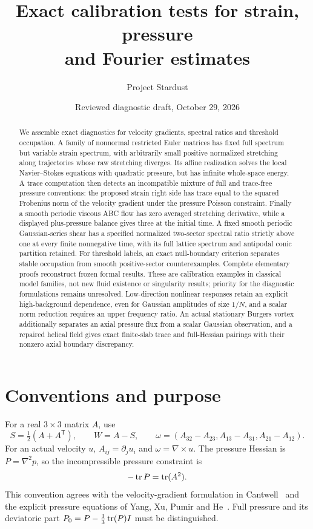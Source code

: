 \documentclass[11pt]{article}
\title{Exact calibration tests for strain, pressure\\and Fourier estimates}
\author{Project Stardust}
\date{Reviewed diagnostic draft, October 29, 2026}
\begin{document}
\maketitle
\begin{abstract}
We assemble exact diagnostics for velocity gradients, spectral ratios
and threshold occupation.
A family of nonnormal restricted Euler matrices has fixed full spectrum but
variable strain spectrum, with arbitrarily small positive normalized
stretching along trajectories whose raw stretching diverges. Its affine
realization solves the local Navier--Stokes equations with quadratic
pressure, but has infinite whole-space energy. A trace computation then
detects an incompatible mixture of full and trace-free pressure
conventions: the proposed strain right side has trace equal to the squared
Frobenius norm of the velocity gradient under the pressure Poisson
constraint. Finally a smooth periodic viscous ABC flow has zero averaged
stretching derivative, while a displayed plus-pressure balance gives
three at the initial time. A fixed smooth periodic Gaussian-series shear
has a specified normalized two-sector spectral ratio strictly above one
at every finite nonnegative time, with its full lattice spectrum and
antipodal conic partition retained. For threshold labels, an exact
null-boundary criterion separates stable occupation from smooth
positive-sector counterexamples. Complete elementary proofs reconstruct frozen
formal results. These are calibration examples in classical model
families, not new fluid existence or singularity results; priority for
the diagnostic formulations remains unresolved.
Low-direction nonlinear responses retain an explicit high-background dependence,
even for Gaussian amplitudes of size $1/N$, and a scalar norm reduction
requires an upper frequency ratio. An actual stationary Burgers vortex additionally separates an axial pressure flux from a scalar Gaussian observation, and a repaired helical field gives exact finite-slab trace and full-Hessian pairings with their nonzero axial boundary discrepancy. \end{abstract}

\section{Conventions and purpose}
For a real $3\times3$ matrix $A$, use
\[
 S=\tfrac12(A+A^{\mathsf T}),\qquad W=A-S,\qquad
 \omega=(A_{32}-A_{23},A_{13}-A_{31},A_{21}-A_{12}).
\]
For an actual velocity $u$, $A_{ij}=\partial_j u_i$ and $\omega=\nabla\times u$.
The pressure Hessian is $P=\nabla^2p$, so the incompressible pressure
constraint is
\begin{equation}\label{eq:poisson}
 -\operatorname{tr} P=\operatorname{tr}(A^2).
\end{equation}
This convention agrees with the velocity-gradient formulation in
Cantwell~\cite{Cantwell} and the explicit pressure equations of
Yang, Xu, Pumir and He~\cite{Yang}. Full pressure and its deviatoric
part $P_0=P-\tfrac13\operatorname{tr}(P)I$ must be distinguished.
\end{document}
